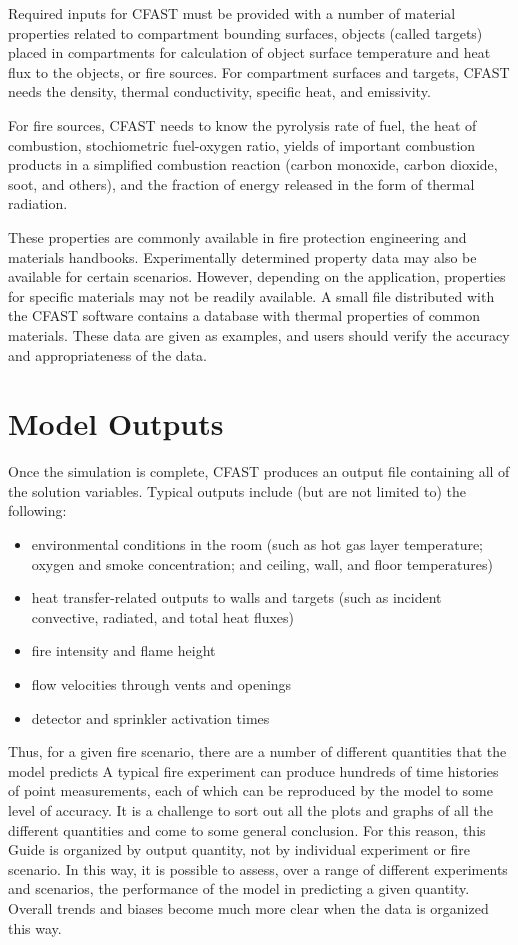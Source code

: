 Required inputs for CFAST must be provided with a number of material properties related to compartment bounding surfaces, objects (called targets) placed in compartments for calculation of object surface temperature and heat flux to the objects, or fire sources.  For compartment surfaces and targets, CFAST needs the density, thermal conductivity, specific heat, and emissivity.

For fire sources, CFAST needs to know the pyrolysis rate of fuel, the heat of combustion, stochiometric fuel-oxygen ratio, yields of important combustion products in a simplified combustion reaction (carbon monoxide, carbon dioxide, soot, and others), and the fraction of energy released in the form of thermal radiation.

These properties are commonly available in fire protection engineering and materials handbooks. Experimentally determined property data may also be available for certain scenarios.  However, depending on the application, properties for specific materials may not be readily available.  A small file distributed with the CFAST software contains a database with thermal properties of common materials.  These data are given as examples, and users should verify the accuracy and appropriateness of the data.

\section{Model Outputs}

Once the simulation is complete, CFAST produces an output file containing all of the solution variables.  Typical outputs include (but are not limited to) the following:

\begin{itemize}
\item environmental conditions in the room (such as hot gas layer temperature; oxygen and smoke concentration; and ceiling, wall, and floor temperatures)
\item heat transfer-related outputs to walls and targets (such as incident convective, radiated, and total heat fluxes)
\item fire intensity and flame height
\item flow velocities through vents and openings
\item detector and sprinkler activation times
\end{itemize}


Thus, for a given fire scenario, there are a number of different quantities that the model predicts A typical
fire experiment can produce hundreds of time histories of point measurements, each of which can be reproduced by the model to some level of accuracy. It is a challenge to sort out all the plots and graphs of all the different quantities and come to some general conclusion. For this reason, this Guide
is organized by output quantity, not by individual experiment or fire scenario. In this way, it is possible to assess, over a range of different experiments and scenarios, the performance of the model in predicting a given quantity. Overall trends and biases become much more clear when the data is organized this way.



